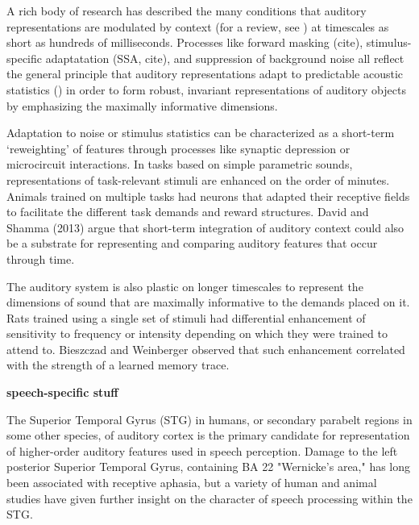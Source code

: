 A rich body of research has described the many conditions that auditory representations are modulated by context (for a review, see \cite{angeloniContextualModulationSound2018}) at timescales as short as hundreds of milliseconds\cite{deanRapidNeuralAdaptation2008b,rabinowitzContrastGainControl2011c}. Processes like forward masking (cite), stimulus-specific adaptatation (SSA, cite), and suppression of background noise all reflect the general principle that auditory representations adapt to predictable acoustic statistics () in order to form robust, invariant representations of auditory objects\cite{rabinowitzConstructingNoiseinvariantRepresentations2013} by emphasizing the maximally informative dimensions\cite{atencioMultidimensionalReceptiveField2017}. 

Adaptation to noise or stimulus statistics can be characterized as a short-term `reweighting' of features through processes like synaptic depression\cite{mesgaraniMechanismsNoiseRobust2014,davidRapidSynapticDepression2009} or microcircuit interactions\cite{natanComplementaryControlSensory2015b,natanCorticalInterneuronsDifferentially2017}. In tasks based on simple parametric sounds, representations of task-relevant stimuli are enhanced on the order of minutes\cite{fritzRapidTaskrelatedPlasticity2003a}. Animals trained on multiple tasks had neurons that adapted their receptive fields to facilitate the different task demands\cite{fritzActiveListeningTaskdependent2005b} and reward structures\cite{davidTaskRewardStructure2012}. David and Shamma (2013\cite{davidIntegrationMultipleTimescales2013}) argue that short-term integration of auditory context could also be a substrate for representing and comparing auditory features that occur through time. 

The auditory system is also plastic on longer timescales to represent the dimensions of sound that are maximally informative to the demands placed on it. Rats trained using a single set of stimuli had differential enhancement of sensitivity to frequency or intensity depending on which they were trained to attend to\cite{Polley2006}. Bieszczad and Weinberger observed that such enhancement correlated with the strength of a learned memory trace\cite{bieszczadRepresentationalGainCortical2010}. 

\textbf{speech-specific stuff}

The Superior Temporal Gyrus (STG) in humans, or secondary parabelt regions in some other species, of auditory cortex is the primary candidate for representation of higher-order auditory features used in speech perception. Damage to the left posterior Superior Temporal Gyrus, containing BA 22 "Wernicke's area," has long been associated with receptive aphasia, but a variety of human and animal studies have given further insight on the character of speech processing within the STG.

